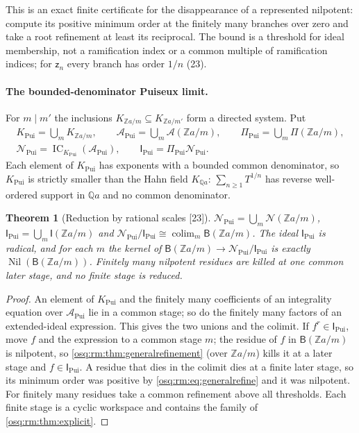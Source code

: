 \documentclass[11pt,letterpaper]{article}
\numberwithin{equation}{section}
\newtheorem{theorem}{Theorem}[section]
\theoremstyle{definition}
\theoremstyle{remark}
\theoremstyle{plain}
\newcommand{\Z}{\mathbb Z}
\newcommand{\Q}{\mathbb Q}
\newcommand{\A}{\mathcal A}          %
\newcommand{\NN}{\mathcal N}         %
\newcommand{\IC}{\operatorname{IC}}
\newcommand{\src}[1]{\textup{\textsf{[#1]}}}
\begin{document}
This is an exact finite certificate for the disappearance of a represented nilpotent: compute its positive minimum order at the finitely many branches
over zero and take a root refinement at least its reciprocal. The bound is a threshold for ideal membership, not a ramification index or a common
multiple of ramification indices; for $\mathsf z_n$ every branch has order $1/n$ (23).

\paragraph{The bounded-denominator Puiseux limit.} For $m\mid m'$ the inclusions $K_{\Z a/m}\subseteq K_{\Z a/m'}$ form a directed system. Put
\begin{equation}\label{osq:rm:eq:pui}
 \begin{gathered}
 K_{\mathrm{Pui}}=\bigcup_mK_{\Z a/m},\qquad \A_{\mathrm{Pui}}=\bigcup_m\A(\Z a/m),\qquad \Pi_{\mathrm{Pui}}=\bigcup_m\Pi(\Z a/m),\\
 \NN_{\mathrm{Pui}}=\IC_{K_{\mathrm{Pui}}}(\A_{\mathrm{Pui}}),\qquad \mathsf I_{\mathrm{Pui}}=\Pi_{\mathrm{Pui}}\NN_{\mathrm{Pui}}.
 \end{gathered}
\end{equation}
Each element of $K_{\mathrm{Pui}}$ has exponents with a bounded common denominator, so $K_{\mathrm{Pui}}$ is strictly smaller than the Hahn field $K_{\Q a}$:
$\sum_{n\ge1}T^{1/n}$ has reverse well-ordered support in $\Q a$ and no common denominator.

\begin{theorem}[Reduction by rational scales \src{23}]\label{osq:rm:thm:pui}
$\NN_{\mathrm{Pui}}=\bigcup_m\NN(\Z a/m)$, $\mathsf I_{\mathrm{Pui}}=\bigcup_m\mathsf I(\Z a/m)$ and $\NN_{\mathrm{Pui}}/\mathsf I_{\mathrm{Pui}}\cong\operatorname{colim}_m\mathsf B(\Z a/m)$.
The ideal $\mathsf I_{\mathrm{Pui}}$ is radical, and for each $m$ the kernel of $\mathsf B(\Z a/m)\to\NN_{\mathrm{Pui}}/\mathsf I_{\mathrm{Pui}}$ is exactly
$\operatorname{Nil}(\mathsf B(\Z a/m))$. Finitely many nilpotent residues are killed at one common later stage, and no finite stage is reduced.
\end{theorem}
\begin{proof}
An element of $K_{\mathrm{Pui}}$ and the finitely many coefficients of an integrality equation over $\A_{\mathrm{Pui}}$ lie in a common stage; so do the finitely
many factors of an extended-ideal expression. This gives the two unions and the colimit. If $f^r\in\mathsf I_{\mathrm{Pui}}$, move $f$ and the expression to a
common stage $m$; the residue of $f$ in $\mathsf B(\Z a/m)$ is nilpotent, so \cref{osq:rm:thm:generalrefinement} (over $\Z a/m$) kills it at a later stage and
$f\in\mathsf I_{\mathrm{Pui}}$. A residue that dies in the colimit dies at a finite later stage, so its minimum order was positive by \eqref{osq:rm:eq:generalrefine}
and it was nilpotent. For finitely many residues take a common refinement above all thresholds. Each finite stage is a cyclic workspace and contains
the family of \cref{osq:rm:thm:explicit}.
\end{proof}
\end{document}
